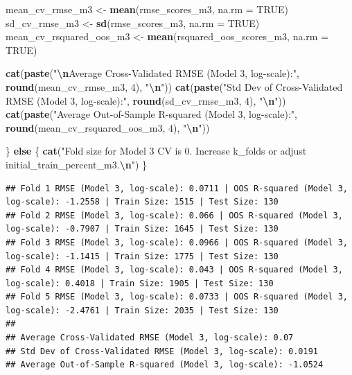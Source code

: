 \documentclass[
]{article}
\newenvironment{Shaded}{\begin{snugshade}}{\end{snugshade}}
\newcommand{\AttributeTok}[1]{\textcolor[rgb]{0.13,0.29,0.53}{#1}}
\newcommand{\ConstantTok}[1]{\textcolor[rgb]{0.56,0.35,0.01}{#1}}
\newcommand{\ControlFlowTok}[1]{\textcolor[rgb]{0.13,0.29,0.53}{\textbf{#1}}}
\newcommand{\DecValTok}[1]{\textcolor[rgb]{0.00,0.00,0.81}{#1}}
\newcommand{\FunctionTok}[1]{\textcolor[rgb]{0.13,0.29,0.53}{\textbf{#1}}}
\newcommand{\NormalTok}[1]{#1}
\newcommand{\OtherTok}[1]{\textcolor[rgb]{0.56,0.35,0.01}{#1}}
\newcommand{\SpecialCharTok}[1]{\textcolor[rgb]{0.81,0.36,0.00}{\textbf{#1}}}
\newcommand{\StringTok}[1]{\textcolor[rgb]{0.31,0.60,0.02}{#1}}
\begin{document}
\begin{Shaded}
\begin{Highlighting}[]
\NormalTok{    mean\_cv\_rmse\_m3 }\OtherTok{\textless{}{-}} \FunctionTok{mean}\NormalTok{(rmse\_scores\_m3, }\AttributeTok{na.rm =} \ConstantTok{TRUE}\NormalTok{)}
\NormalTok{    sd\_cv\_rmse\_m3 }\OtherTok{\textless{}{-}} \FunctionTok{sd}\NormalTok{(rmse\_scores\_m3, }\AttributeTok{na.rm =} \ConstantTok{TRUE}\NormalTok{)}
\NormalTok{    mean\_cv\_rsquared\_oos\_m3 }\OtherTok{\textless{}{-}} \FunctionTok{mean}\NormalTok{(rsquared\_oos\_scores\_m3, }\AttributeTok{na.rm =} \ConstantTok{TRUE}\NormalTok{)}
    
    \FunctionTok{cat}\NormalTok{(}\FunctionTok{paste}\NormalTok{(}\StringTok{"}\SpecialCharTok{\textbackslash{}n}\StringTok{Average Cross{-}Validated RMSE (Model 3, log{-}scale):"}\NormalTok{, }\FunctionTok{round}\NormalTok{(mean\_cv\_rmse\_m3, }\DecValTok{4}\NormalTok{), }\StringTok{"}\SpecialCharTok{\textbackslash{}n}\StringTok{"}\NormalTok{))}
    \FunctionTok{cat}\NormalTok{(}\FunctionTok{paste}\NormalTok{(}\StringTok{"Std Dev of Cross{-}Validated RMSE (Model 3, log{-}scale):"}\NormalTok{, }\FunctionTok{round}\NormalTok{(sd\_cv\_rmse\_m3, }\DecValTok{4}\NormalTok{), }\StringTok{"}\SpecialCharTok{\textbackslash{}n}\StringTok{"}\NormalTok{))}
    \FunctionTok{cat}\NormalTok{(}\FunctionTok{paste}\NormalTok{(}\StringTok{"Average Out{-}of{-}Sample R{-}squared (Model 3, log{-}scale):"}\NormalTok{, }\FunctionTok{round}\NormalTok{(mean\_cv\_rsquared\_oos\_m3, }\DecValTok{4}\NormalTok{), }\StringTok{"}\SpecialCharTok{\textbackslash{}n}\StringTok{"}\NormalTok{))}
    
\NormalTok{  \} }\ControlFlowTok{else}\NormalTok{ \{}
    \FunctionTok{cat}\NormalTok{(}\StringTok{"Fold size for Model 3 CV is 0. Increase k\_folds or adjust initial\_train\_percent\_m3.}\SpecialCharTok{\textbackslash{}n}\StringTok{"}\NormalTok{)}
\NormalTok{  \}}
\end{Highlighting}
\end{Shaded}

\begin{verbatim}
## Fold 1 RMSE (Model 3, log-scale): 0.0711 | OOS R-squared (Model 3, log-scale): -1.2558 | Train Size: 1515 | Test Size: 130 
## Fold 2 RMSE (Model 3, log-scale): 0.066 | OOS R-squared (Model 3, log-scale): -0.7907 | Train Size: 1645 | Test Size: 130 
## Fold 3 RMSE (Model 3, log-scale): 0.0966 | OOS R-squared (Model 3, log-scale): -1.1415 | Train Size: 1775 | Test Size: 130 
## Fold 4 RMSE (Model 3, log-scale): 0.043 | OOS R-squared (Model 3, log-scale): 0.4018 | Train Size: 1905 | Test Size: 130 
## Fold 5 RMSE (Model 3, log-scale): 0.0733 | OOS R-squared (Model 3, log-scale): -2.4761 | Train Size: 2035 | Test Size: 130 
## 
## Average Cross-Validated RMSE (Model 3, log-scale): 0.07 
## Std Dev of Cross-Validated RMSE (Model 3, log-scale): 0.0191 
## Average Out-of-Sample R-squared (Model 3, log-scale): -1.0524
\end{verbatim}
\end{document}
